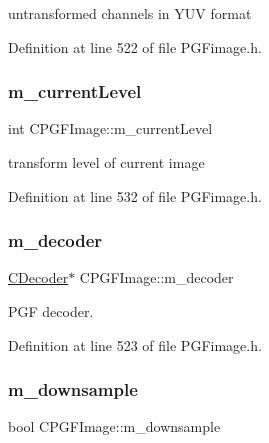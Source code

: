 untransformed channels in Y\+UV format 



Definition at line 522 of file P\+G\+Fimage.\+h.

\mbox{\label{classCPGFImage_a2790b468b6d4841cd34473c4b61d0c7f}} 
\subsubsection{\texorpdfstring{m\_currentLevel}{m\_currentLevel}}
{\footnotesize\ttfamily int C\+P\+G\+F\+Image\+::m\+\_\+current\+Level\hspace{0.3cm}{\ttfamily [protected]}}



transform level of current image 



Definition at line 532 of file P\+G\+Fimage.\+h.

\mbox{\label{classCPGFImage_a1058b29a3d046e171a2fe48168b66d38}} 
\subsubsection{\texorpdfstring{m\_decoder}{m\_decoder}}
{\footnotesize\ttfamily \mbox{\hyperlink{classCDecoder}{C\+Decoder}}$\ast$ C\+P\+G\+F\+Image\+::m\+\_\+decoder\hspace{0.3cm}{\ttfamily [protected]}}



P\+GF decoder. 



Definition at line 523 of file P\+G\+Fimage.\+h.

\mbox{\label{classCPGFImage_a9226595ea6b907e4d07301a6ee641b87}} 
\subsubsection{\texorpdfstring{m\_downsample}{m\_downsample}}
{\footnotesize\ttfamily bool C\+P\+G\+F\+Image\+::m\+\_\+downsample\hspace{0.3cm}{\ttfamily [protected]}}



